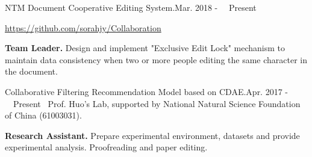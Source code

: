 \documentclass{sorahjy_cv}
\begin{document}
\begin{sectionContentSimple}{NTM Document Cooperative Editing System.}{Mar. 2018 - \ \ Present \ }
	\item \url{https://github.com/sorahjy/Collaboration}
	\item \textbf{Team Leader.} Design and implement "Exclusive Edit Lock" mechanism to maintain data consistency when two or more people editing the same character in the document.
\end{sectionContentSimple}


\begin{sectionContentNormal}{Collaborative Filtering Recommendation Model based on CDAE.}{Apr. 2017 - \ \ Present \ }{Prof. Huo's Lab, supported by National Natural Science Foundation of China (61003031).}
	\item \textbf{Research Assistant.} Prepare experimental environment, datasets and provide experimental analysis. Proofreading and paper editing.
\end{sectionContentNormal}

%
%









\end{document}
